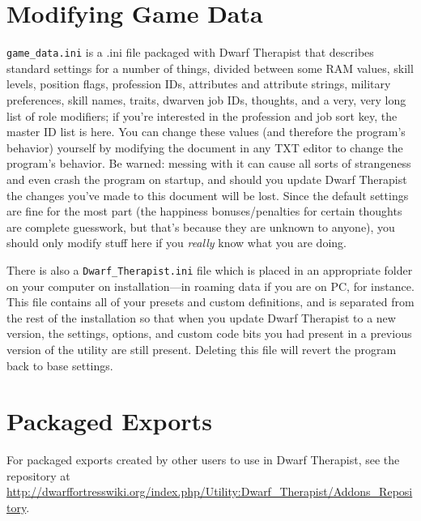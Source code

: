 \documentclass[]{article}
\begin{document}
\section{Modifying Game Data}
\label{sec:Profession IDs}
\label{sec:Game Data}

\texttt{game\_data.ini} is a .ini file packaged with Dwarf Therapist that describes standard settings for
a number of things, divided between some RAM values, skill levels, position flags, profession IDs,
attributes and attribute strings, military preferences, skill names, traits, dwarven job IDs, thoughts,
and a very, very long list of role modifiers; if you're interested in the profession and job
sort key, the master ID list is here. You can change these values (and therefore the program's behavior)
yourself by modifying the document in any TXT editor to change the program's behavior. Be warned:
messing with it can cause all sorts of strangeness and even crash the program on startup, and should you
update Dwarf Therapist the changes you've made to this document will be lost. Since the default settings
are fine for the most part (the happiness bonuses/penalties for certain thoughts are complete guesswork,
but that's because they are unknown to anyone), you should only modify stuff here if you \emph{really}
know what you are doing.

There is also a \texttt{Dwarf\_Therapist.ini} file which is placed in an appropriate folder on your
computer on installation---in roaming data if you are on PC, for instance. This file contains all of
your presets and custom definitions, and is separated from the rest of the installation so that when you
update Dwarf Therapist to a new version, the settings, options, and custom code bits you had present in
a previous version of the utility are still present. Deleting this file will revert the program back to
base settings.

\section{Packaged Exports}
\label{sec:Packaged Exports}

For packaged exports created by other users to use in Dwarf Therapist, see the repository at \url{http://dwarffortresswiki.org/index.php/Utility:Dwarf_Therapist/Addons_Repository}.

\newpage
\end{document}
